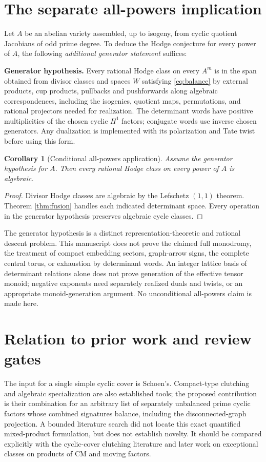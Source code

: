 \documentclass[11pt]{article}
\newtheorem{corollary}[theorem]{Corollary}
\theoremstyle{definition}
\begin{document}
\section{The separate all-powers implication}\label{sec:conditional}
Let $A$ be an abelian variety assembled, up to isogeny, from cyclic quotient
Jacobians of odd prime degree. To deduce the Hodge conjecture for every power
of $A$, the following \emph{additional generator statement} suffices:

\medskip\noindent
\textbf{Generator hypothesis.} Every rational Hodge class on every $A^m$
is in the span obtained from divisor classes and spaces $W$ satisfying
\eqref{eq:balance} by external products, cup products, pullbacks and
pushforwards along algebraic correspondences, including the isogenies,
quotient maps, permutations, and rational projectors needed for realization.
The determinant words have positive multiplicities of the chosen cyclic
$H^1$ factors; conjugate words use inverse chosen generators. Any dualization
is implemented with its polarization and Tate twist before using this form.
\medskip

\begin{corollary}[Conditional all-powers application]
Assume the generator hypothesis for $A$. Then every rational Hodge class on
every power of $A$ is algebraic.
\end{corollary}
\begin{proof}
Divisor Hodge classes are algebraic by the Lefschetz $(1,1)$ theorem. Theorem
\ref{thm:fusion} handles each indicated determinant space. Every operation in
the generator hypothesis preserves algebraic cycle classes.
\end{proof}

The generator hypothesis is a distinct representation-theoretic and rational
descent problem. This manuscript does not prove the claimed full monodromy,
the treatment of compact embedding sectors, graph-arrow signs, the complete
central torus, or exhaustion by determinant words. An integer lattice basis
of determinant relations alone does not prove generation of the effective
tensor monoid; negative exponents need separately realized duals and twists,
or an appropriate monoid-generation argument. No unconditional all-powers
claim is made here.

\section{Relation to prior work and review gates}
The input for a single simple cyclic cover is Schoen's. Compact-type clutching
and algebraic specialization are also established tools; the proposed
contribution is their combination for an arbitrary list of separately
unbalanced prime cyclic factors whose combined signatures balance, including
the disconnected-graph projection. A bounded literature search did not locate
this exact quantified mixed-product formulation, but does not establish novelty.
It should be compared explicitly with the cyclic-cover clutching literature
and later work on exceptional classes on products of CM and moving factors.
\end{document}
